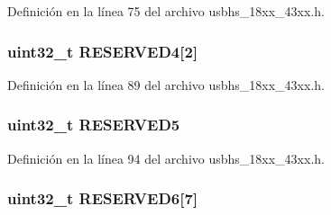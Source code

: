 Definición en la línea 75 del archivo usbhs\+\_\+18xx\+\_\+43xx.\+h.

\subsubsection[{\texorpdfstring{R\+E\+S\+E\+R\+V\+E\+D4}{RESERVED4}}]{ uint32\+\_\+t R\+E\+S\+E\+R\+V\+E\+D4\mbox{[}2\mbox{]}}\hypertarget{struct_l_p_c___u_s_b_h_s___t_adcde36755ddc4fd76b5514815f2fb143}{}\label{struct_l_p_c___u_s_b_h_s___t_adcde36755ddc4fd76b5514815f2fb143}


Definición en la línea 89 del archivo usbhs\+\_\+18xx\+\_\+43xx.\+h.

\subsubsection[{\texorpdfstring{R\+E\+S\+E\+R\+V\+E\+D5}{RESERVED5}}]{ uint32\+\_\+t R\+E\+S\+E\+R\+V\+E\+D5}\hypertarget{struct_l_p_c___u_s_b_h_s___t_aa83bddd1f180bafbb96085399f847cd7}{}\label{struct_l_p_c___u_s_b_h_s___t_aa83bddd1f180bafbb96085399f847cd7}


Definición en la línea 94 del archivo usbhs\+\_\+18xx\+\_\+43xx.\+h.

\subsubsection[{\texorpdfstring{R\+E\+S\+E\+R\+V\+E\+D6}{RESERVED6}}]{ uint32\+\_\+t R\+E\+S\+E\+R\+V\+E\+D6\mbox{[}7\mbox{]}}\hypertarget{struct_l_p_c___u_s_b_h_s___t_a5a044e9fe400f6f23a32a60c515fb417}{}\label{struct_l_p_c___u_s_b_h_s___t_a5a044e9fe400f6f23a32a60c515fb417}


